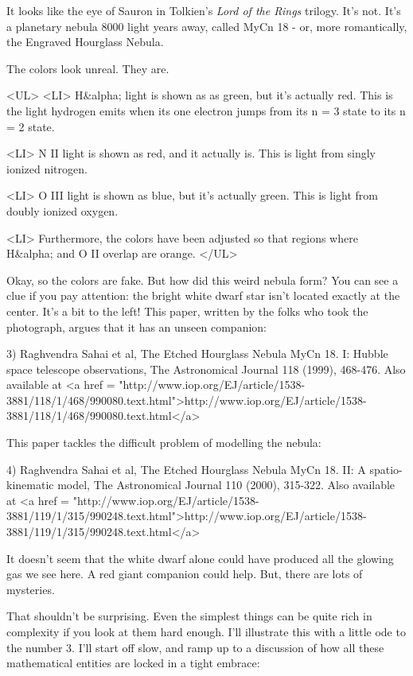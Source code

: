 It looks like the eye of Sauron in Tolkien's \emph{Lord of the Rings} 
trilogy.  It's not.  It's a planetary nebula 8000 light years away, called
MyCn 18 - or, more romantically, the Engraved Hourglass Nebula.

The colors look unreal.  They are.

<UL>
<LI>
 H&alpha; light is shown as as green, but it's actually red.  This is 
 the light hydrogen emits when its one electron jumps from its n = 3 
 state to its n = 2 state.

<LI>
 N II light is shown as red, and it actually is.  This is light 
 from singly ionized nitrogen.

<LI>
 O III light is shown as blue, but it's actually green.  This is 
 light from doubly ionized oxygen.  

<LI>
 Furthermore, the colors have been adjusted so that regions where 
 H&alpha; and O II overlap are orange.
</UL>

Okay, so the colors are fake.  But how did this weird nebula form?  
You can see a clue if you pay attention: the bright white dwarf 
star isn't located exactly at the center.  It's a bit to the left!  
This paper, written by the folks who took the photograph, argues 
that it has an unseen companion:

3) Raghvendra Sahai et al, The Etched Hourglass Nebula MyCn 18.  
I: Hubble space telescope observations, The Astronomical Journal
118 (1999), 468-476.  Also available at
<a href = "http://www.iop.org/EJ/article/1538-3881/118/1/468/990080.text.html">http://www.iop.org/EJ/article/1538-3881/118/1/468/990080.text.html</a>

This paper tackles the difficult problem of modelling the nebula:

4) Raghvendra Sahai et al, The Etched Hourglass Nebula MyCn 18.  
II: A spatio-kinematic model, The Astronomical Journal
110 (2000), 315-322.  Also available at
<a href = "http://www.iop.org/EJ/article/1538-3881/119/1/315/990248.text.html">http://www.iop.org/EJ/article/1538-3881/119/1/315/990248.text.html</a>

It doesn't seem that the white dwarf alone could have produced all
the glowing gas we see here.   A red giant companion could help.
But, there are lots of mysteries.  

That shouldn't be surprising.  Even the simplest things can be quite
rich in complexity if you look at them hard enough.  I'll illustrate 
this with a little ode to the number 3.  I'll start off slow, and 
ramp up to a discussion of how all these mathematical entities are 
locked in a tight embrace:

